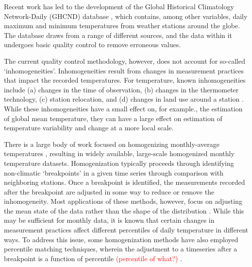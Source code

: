 \documentclass[letter]{article}
\newcommand \tcr[1]{\textcolor{red}{(#1)}}
\begin{document}
Recent work has led to the development of the Global Historical Climatology Network-Daily (GHCND) database \citep{menne2012overview}, which contains, among other variables, daily maximum and minimum temperatures from weather stations around the globe. The database draws from a range of different sources, and the data within it undergoes basic quality control to remove erroneous values. 

The current quality control methodology, however, does not account for so-called `inhomogeneities'. Inhomogeneities result from changes in measurement practices that impact the recorded temperatures. For temperature, known inhomogeneities include (a) changes in the time of observation, (b) changes in the thermometer technology, (c) station relocation, and (d) changes in land use around a station \citep{menne2009us}. While these inhomogeneities have a small effect on, for example., the estimation of global mean temperature, they can have a large effect on estimation of temperature variability and change at a more local scale.

There is a large body of work focused on homogenizing monthly-average temperatures \citep[e.g.,][]{karl1986model, easterling1996development, peterson1998homogeneity, ducre2003comparison, menne2009homogenization, vincent2012second}, resulting in widely available, large-scale homogenized monthly temperature datasets. 
Homogenization typically proceeds through identifying non-climatic `breakpoints' in a given time series through comparison with neighboring stations.
Once a breakpoint is identified, the measurements recorded after the breakpoint are adjusted in some way to reduce or remove the inhomogeneity.
Most applications of these methods, however, focus on adjusting the mean state of the data rather than the shape of the distribution \citep[see][and references therein]{della2006method}.
While this may be sufficient for monthly data, it is known that certain changes in measurement practices affect different percentiles of daily temperature in different ways.
To address this issue, some homogenization methods have also employed percentile matching techniques, wherein the adjustment to a timeseries after a breakpoint is a function of percentile \tcr{percentile of what?} \citep{della2006method, trewin2013daily}. 
\end{document}
